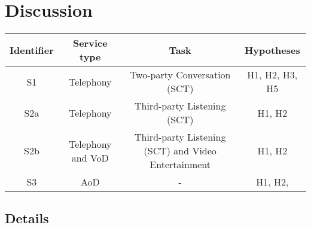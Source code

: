 \section{Discussion}
\begin{table}[h]
	\begin{tabular}{|c|c|c|c|}
	Identifier	& Service type 			& Task 									& Hypotheses \\
	\hline
	S1			& Telephony				& Two-party Conversation (\ac{SCT})	& H1, H2, H3, H5 \\
	S2a			& Telephony				& Third-party Listening	(\ac{SCT})		& H1, H2 \\ 
	S2b			& Telephony and \ac{VoD}& Third-party Listening	(\ac{SCT}) and Video Entertainment & H1, H2 \\  %
	S3			& \ac{AoD}				& -										& H1, H2,
	\end{tabular}
\end{table}

\subsection{Details}

